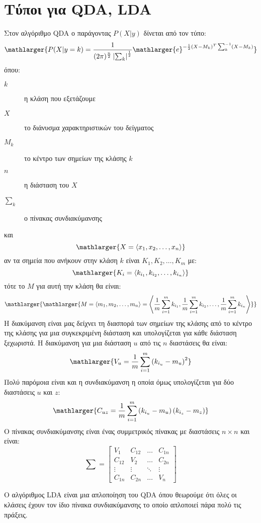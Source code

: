 \newpage
\section{Τύποι για \textlatin{QDA, LDA}}
\label{app:app1}
Στον αλγόριθμο \textlatin{QDA} ο παράγοντας $P(X|y)$ δίνεται από τον τύπο:
$$\mathlarger{P(X|y=k)=\frac{1}{(2\pi)^\frac{n}{2}\left\lvert \sum_k\right\rvert^\frac{1}{2}}\mathlarger{e}^{-\frac{1}{2}(X-M_k)^T\sum_k^{-1}(X-M_k)}}$$
όπου:
\begin{description}
    \item[$k$] η κλάση που εξετάζουμε
    \item[$X$] το διάνυσμα χαρακτηριστικών του δείγματος
    \item[$M_k$] το κέντρο των σημείων της κλάσης $k$
    \item[$n$] η διάσταση του $X$
    \item[$\sum_k$] ο πίνακας συνδιακύμανσης
\end{description}
και
$$\mathlarger{X=\left\langle x_1,x_2,\dots,x_n\right\rangle}$$
αν τα σημεία που ανήκουν στην κλάση $k$ είναι $K_1,K_2,\dots,K_m$ με:
$$\mathlarger{K_i=\left\langle k_{i_1},k_{i_2},\dots,k_{i_n}\right\rangle}$$
τότε το $M$ για αυτή την κλάση θα είναι:
$$\mathlarger{\mathlarger{M=\left\langle m_1,m_2,\dots,m_n\right\rangle =\left\langle \frac{1}{m}\sum\limits_{i=1}^{m}k_{i_1},\frac{1}{m}\sum\limits_{i=1}^{m}k_{i_2},\dots,\frac{1}{m}\sum\limits_{i=1}^{m}k_{i_n}\right\rangle}}$$
Η διακύμανση είναι μας δείχνει τη διασπορά των σημείων της κλάσης από το κέντρο
της κλάσης για μια συγκεκριμένη διάσταση και υπολογίζεται για κάθε διάσταση
ξεχωριστά. Η διακύμανση για μια διάσταση $u$ από τις $n$ διαστάσεις θα είναι:
$$\mathlarger{V_u=\frac{1}{m}\sum\limits_{i=1}^{m}\left(k_{i_u}-m_u\right)^2}$$
Πολύ παρόμοια είναι και η συνδιακύμανση η οποία όμως υπολογίζεται για δύο
διαστάσεις $u$ και $z$:
$$\mathlarger{C_{uz}=\frac{1}{m}\sum\limits_{i=1}^{m}\left(k_{i_u}-m_u\right)\left(k_{i_z}-m_z\right)}$$
Ο πίνακας συνδιακύμανσης είναι ένας συμμετρικός πίνακας με διαστάσεις
$n\times n$ και είναι:
$$
\sum =
\begin{bmatrix}
    V_1 & C_{12} & \dots & C_{1n} \\
    C_{12} & V_2 & \dots & C_{2n} \\
    \vdots & \vdots & \ddots & \vdots \\
    C_{1n} & C_{2n} & \dots & V_n
\end{bmatrix}
$$

Ο αλγόριθμος \textlatin{LDA} είναι μια απλοποίηση του \textlatin{QDA} όπου
θεωρούμε ότι όλες οι κλάσεις έχουν τον ίδιο πίνακα συνδιακύμανσης το οποίο
απλοποιεί πάρα πολύ τις πράξεις.